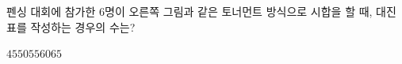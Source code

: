 \hspace*{2mm}\begin{minipage}[t]{\dimexpr\linewidth-2mm\relax}\vspace{0pt}
\noindent\begin{minipage}[t]{0.58\linewidth}\vspace{0pt}\raggedright 펜싱 대회에 참가한 $6$명이 오른쪽 그림과 같은 토너먼트 방식으로 시합을 할 때, 대진표를 작성하는 경우의 수는?\end{minipage}\hfill\begin{minipage}[t]{0.4\linewidth}\vspace{0pt}\centering \resizebox{\ifdim\width>\linewidth\linewidth\else\width\fi}{!}{}\end{minipage}\par
\begin{choices32}{$45$}{$50$}{$55$}{$60$}{$65$}\end{choices32}\end{minipage}
